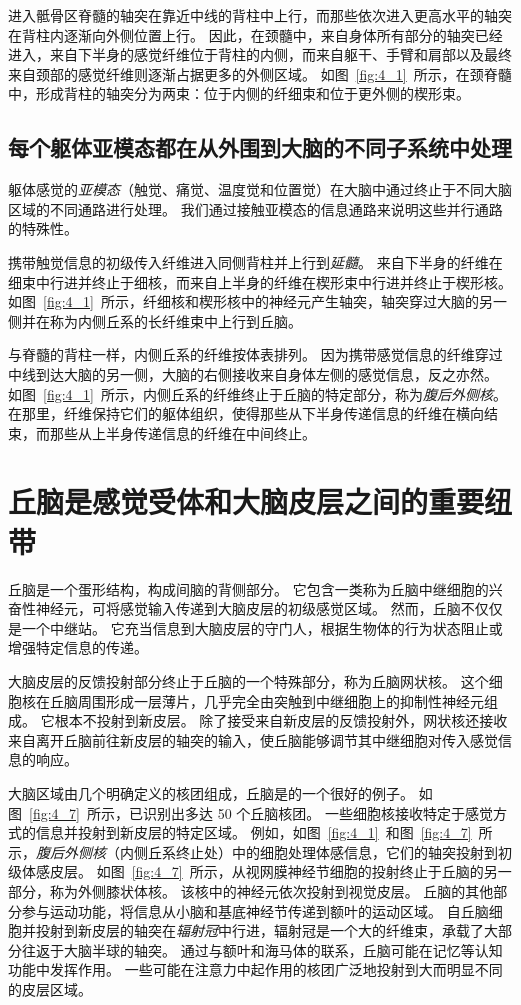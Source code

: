 进入骶骨区脊髓的轴突在靠近中线的背柱中上行，而那些依次进入更高水平的轴突在背柱内逐渐向外侧位置上行。 
因此，在颈髓中，来自身体所有部分的轴突已经进入，来自下半身的感觉纤维位于背柱的内侧，而来自躯干、手臂和肩部以及最终来自颈部的感觉纤维则逐渐占据更多的外侧区域。
如图~\ref{fig:4_1}~所示，在颈脊髓中，形成背柱的轴突分为两束：位于内侧的纤细束和位于更外侧的楔形束。



\subsection{每个躯体亚模态都在从外围到大脑的不同子系统中处理}

躯体感觉的\textit{亚模态}（触觉、痛觉、温度觉和位置觉）在大脑中通过终止于不同大脑区域的不同通路进行处理。
我们通过接触亚模态的信息通路来说明这些并行通路的特殊性。


携带触觉信息的初级传入纤维进入同侧背柱并上行到\textit{延髓}。
来自下半身的纤维在细束中行进并终止于细核，而来自上半身的纤维在楔形束中行进并终止于楔形核。
如图~\ref{fig:4_1}~所示，纤细核和楔形核中的神经元产生轴突，轴突穿过大脑的另一侧并在称为内侧丘系的长纤维束中上行到丘脑。


与脊髓的背柱一样，内侧丘系的纤维按体表排列。
因为携带感觉信息的纤维穿过中线到达大脑的另一侧，大脑的右侧接收来自身体左侧的感觉信息，反之亦然。
如图~\ref{fig:4_1}~所示，内侧丘系的纤维终止于丘脑的特定部分，称为\textit{腹后外侧核}。
在那里，纤维保持它们的躯体组织，使得那些从下半身传递信息的纤维在横向结束，而那些从上半身传递信息的纤维在中间终止。



\section{丘脑是感觉受体和大脑皮层之间的重要纽带}

丘脑是一个蛋形结构，构成间脑的背侧部分。
它包含一类称为丘脑中继细胞的兴奋性神经元，可将感觉输入传递到大脑皮层的初级感觉区域。 
然而，丘脑不仅仅是一个中继站。 
它充当信息到大脑皮层的守门人，根据生物体的行为状态阻止或增强特定信息的传递。


大脑皮层的反馈投射部分终止于丘脑的一个特殊部分，称为丘脑网状核。 
这个细胞核在丘脑周围形成一层薄片，几乎完全由突触到中继细胞上的抑制性神经元组成。 
它根本不投射到新皮层。 
除了接受来自新皮层的反馈投射外，网状核还接收来自离开丘脑前往新皮层的轴突的输入，使丘脑能够调节其中继细胞对传入感觉信息的响应。


大脑区域由几个明确定义的核团组成，丘脑是的一个很好的例子。
如图~\ref{fig:4_7}~所示，已识别出多达 50 个丘脑核团。
一些细胞核接收特定于感觉方式的信息并投射到新皮层的特定区域。
例如，如图~\ref{fig:4_1}~和图~\ref{fig:4_7}~所示，\textit{腹后外侧核}（内侧丘系终止处）中的细胞处理体感信息，它们的轴突投射到初级体感皮层。
如图~\ref{fig:4_7}~所示，从视网膜神经节细胞的投射终止于丘脑的另一部分，称为外侧膝状体核。 
该核中的神经元依次投射到视觉皮层。 
丘脑的其他部分参与运动功能，将信息从小脑和基底神经节传递到额叶的运动区域。 
自丘脑细胞并投射到新皮层的轴突在\textit{辐射冠}中行进，辐射冠是一个大的纤维束，承载了大部分往返于大脑半球的轴突。
通过与额叶和海马体的联系，丘脑可能在记忆等认知功能中发挥作用。 
一些可能在注意力中起作用的核团广泛地投射到大而明显不同的皮层区域。


